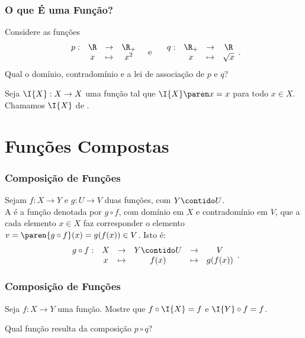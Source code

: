 \documentclass[10pt]{beamer}
\begin{document}
\begin{frame}
\frametitle{O que É uma Função?} 
\begin{exemplo}
Considere as funções
$$\begin{array}{cccc}
p : & \R & \to     & \R_+ \\
		 &  x & \mapsto & x^2
\end{array}
\text{\ \ \  e \ \ \ }
\begin{array}{cccc}
q : & \R_+ & \to     & \R \\
		 &  x & \mapsto & \sqrt x
\end{array}.$$
Qual o domínio, contradomínio e a lei de associação de $p$ e $q$?
\end{exemplo}
\pause

\begin{exemplo}
Seja $\I{X} : X \to X $ uma função tal que $\I{X} \paren x = x$ para
todo $x \in X$. Chamamos $\I{X}$ de .
\end{exemplo}

\end{frame}


\section{Funções Compostas}
\begin{frame}
\frametitle{Composição de Funções} 

\begin{definicao}
Sejam $f: X \to Y$ e $g: U \to V$ duas funções, com $Y \contido U$.\\
A  é a função denotada por $g
\circ f$, com domínio em $X$ e contradomínio em $V$, que a cada
elemento $x \in X$ faz corresponder o elemento $v = \paren{g \circ
f}(x) = g(f(x)) \in V$. Isto é:
$$\begin{array}{cccccc}
g \circ f : & X & \to     & Y \contido U & \to & V \\
		 &  x & \mapsto & f(x) & \mapsto & g(f(x))
\end{array}.$$
\end{definicao}

\end{frame}


\begin{frame}
\frametitle{Composição de Funções} 

\begin{exemplo}
Seja $f: X \to Y$ uma função. Mostre que $f \circ \I{X} = f$ e $\I{Y}
\circ f = f$.
\end{exemplo}\pause

\begin{exemplo}
Qual função resulta da composição $p \circ q$?
\end{exemplo}
\end{frame}
\end{document}
